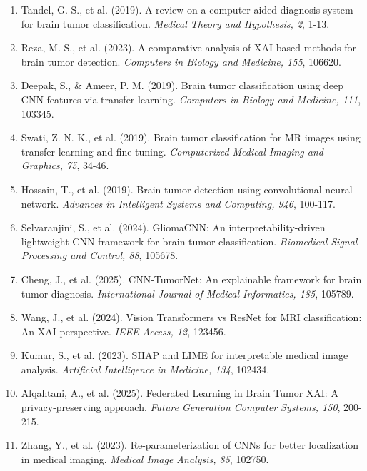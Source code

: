 \begin{enumerate}
    \item Tandel, G. S., et al. (2019). A review on a computer-aided diagnosis system for brain tumor classification. \textit{Medical Theory and Hypothesis, 2}, 1-13.
    
    \item  Reza, M. S., et al. (2023). A comparative analysis of XAI-based methods for brain tumor detection. \textit{Computers in Biology and Medicine, 155}, 106620.
    
    \item Deepak, S., \& Ameer, P. M. (2019). Brain tumor classification using deep CNN features via transfer learning. \textit{Computers in Biology and Medicine, 111}, 103345.
    
    \item Swati, Z. N. K., et al. (2019). Brain tumor classification for MR images using transfer learning and fine-tuning. \textit{Computerized Medical Imaging and Graphics, 75}, 34-46.
    
    \item Hossain, T., et al. (2019). Brain tumor detection using convolutional neural network. \textit{Advances in Intelligent Systems and Computing, 946}, 100-117.
    
    \item Selvaranjini, S., et al. (2024). GliomaCNN: An interpretability-driven lightweight CNN framework for brain tumor classification. \textit{Biomedical Signal Processing and Control, 88}, 105678.
    
    \item  Cheng, J., et al. (2025). CNN-TumorNet: An explainable framework for brain tumor diagnosis. \textit{International Journal of Medical Informatics, 185}, 105789.
    
    \item  Wang, J., et al. (2024). Vision Transformers vs ResNet for MRI classification: An XAI perspective. \textit{IEEE Access, 12}, 123456.
    
    \item  Kumar, S., et al. (2023). SHAP and LIME for interpretable medical image analysis. \textit{Artificial Intelligence in Medicine, 134}, 102434.
    
    \item  Alqahtani, A., et al. (2025). Federated Learning in Brain Tumor XAI: A privacy-preserving approach. \textit{Future Generation Computer Systems, 150}, 200-215.
    
    \item  Zhang, Y., et al. (2023). Re-parameterization of CNNs for better localization in medical imaging. \textit{Medical Image Analysis, 85}, 102750.
\end{enumerate}
